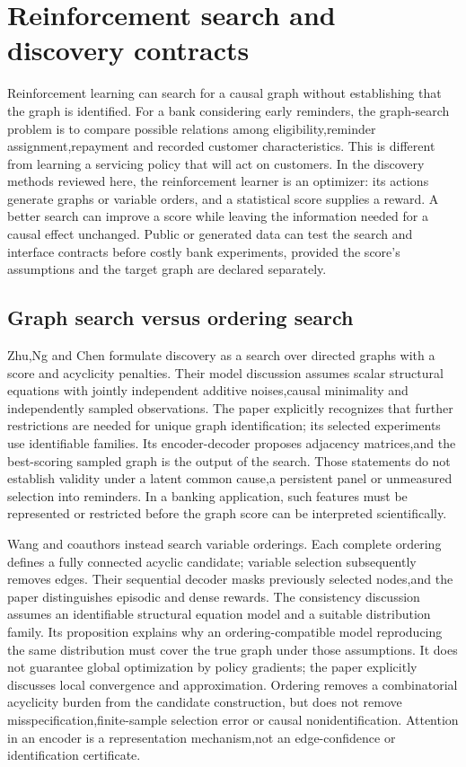 \section[Reinforcement search and discovery contracts]{Reinforcement search and discovery contracts}
\label{sec:exec28-rl}
Reinforcement learning can search for a causal graph without establishing that the graph is identified.
For a bank considering early reminders, the graph-search problem is to compare possible relations
among eligibility,reminder assignment,repayment and recorded customer characteristics. This is
different from learning a servicing policy that will act on customers. In the discovery methods
reviewed here, the reinforcement learner is an optimizer: its actions generate graphs or variable
orders, and a statistical score supplies a reward. A better search can improve a score while
leaving the information needed for a causal effect unchanged. Public or generated data can test
the search and interface contracts before costly bank experiments, provided the score's assumptions
and the target graph are declared separately.~\citep{exec28_rl_zhu,exec28_rl_wang}

\subsection{Graph search versus ordering search}
Zhu,Ng and Chen formulate discovery as a search over directed graphs with a score and acyclicity
penalties. Their model discussion assumes scalar structural equations with jointly independent
additive noises,causal minimality and independently sampled observations. The paper explicitly
recognizes that further restrictions are needed for unique graph identification; its selected
experiments use identifiable families. Its encoder-decoder proposes adjacency matrices,and the
best-scoring sampled graph is the output of the search. Those statements do not establish validity
under a latent common cause,a persistent panel or unmeasured selection into reminders. In a
banking application, such features must be represented or restricted before the graph score can
be interpreted scientifically.~\citep{exec28_rl_zhu}

Wang and coauthors instead search variable orderings. Each complete ordering defines a fully
connected acyclic candidate; variable selection subsequently removes edges. Their sequential
decoder masks previously selected nodes,and the paper distinguishes episodic and dense rewards.
The consistency discussion assumes an identifiable structural equation model and a suitable
distribution family. Its proposition explains why an ordering-compatible model reproducing the
same distribution must cover the true graph under those assumptions. It does not guarantee
global optimization by policy gradients; the paper explicitly discusses local convergence and
approximation. Ordering removes a combinatorial acyclicity burden from the candidate construction,
but does not remove misspecification,finite-sample selection error or causal nonidentification.
Attention in an encoder is a representation mechanism,not an edge-confidence or identification
certificate.~\citep{exec28_rl_wang}

